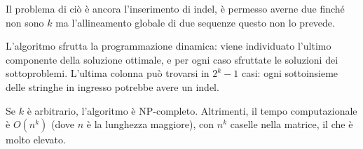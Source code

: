 Il problema di ciò è ancora l'inserimento di indel, è permesso averne due finché non sono $k$ ma l'allineamento globale di due sequenze questo non lo prevede.

L'algoritmo sfrutta la programmazione dinamica: viene individuato l'ultimo componente della soluzione ottimale, e per ogni caso sfruttate le soluzioni dei sottoproblemi. L'ultima colonna può trovarsi in $2^k - 1$ casi: ogni sottoinsieme delle stringhe in ingresso potrebbe avere un indel. 

Se $k$ è arbitrario, l'algoritmo è NP-completo. Altrimenti, il tempo computazionale è $O(n^k)$ (dove $n$ è la lunghezza maggiore), con $n^k$ caselle nella matrice, il che è molto elevato. 
	
